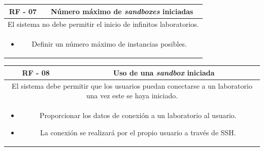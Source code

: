                 \begin{table}[!htbp]
                    \centering
                    \begin{tabular}{|c|c|}
                        \hline
                        \textbf{RF - 07} & \textbf{Número máximo de \textit{sandboxes} iniciadas} \\
                        \hline
                        \multicolumn{2}{|p{15cm}|}{
                            El sistema no debe permitir el inicio de infinitos laboratorios.
                        } \\
                        \hline
                        \multicolumn{2}{|p{15cm}|}{
                            \begin{itemize}
                                \item Definir un número máximo de instancias posibles.
                            \end{itemize}
                            } \\
                        \hline
                    \end{tabular}
                    \label{tab:RF7}
                \end{table}
                
                \begin{table}[!htbp]
                    \centering
                    \begin{tabular}{|c|c|}
                        \hline
                        \textbf{RF - 08} & \textbf{Uso de una \textit{sandbox} iniciada} \\
                        \hline
                        \multicolumn{2}{|p{15cm}|}{
                            El sistema debe permitir que los usuarios puedan conectarse a un laboratorio una vez este se haya iniciado.
                        } \\
                        \hline
                        \multicolumn{2}{|p{15cm}|}{
                            \begin{itemize}
                                \item Proporcionar los datos de conexión a un laboratorio al usuario.
                                \item La conexión se realizará por el propio usuario a través de SSH.
                            \end{itemize}
                            } \\
                        \hline
                    \end{tabular}
                    \label{tab:RF8}
                \end{table}
                
